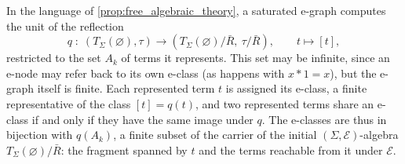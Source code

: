 In the language of \cref{prop:free_algebraic_theory}, a saturated e-graph
computes the unit of the reflection
\[
q \;:\; (T_\Sigma(\varnothing), \tau)
\longrightarrow (T_\Sigma(\varnothing)/\bar R,\ \tau/\bar R),
\qquad t \mapsto [t],
\]
restricted to the set $A_k$ of terms it represents. This set may be
infinite, since an e-node may refer back to its own e-class (as happens
with $x \ast 1 = x$), but the e-graph itself is finite. 
Each
represented term $t$ is assigned its e-class, a finite representative of
the class $[t] = q(t)$, and two represented terms share an e-class if and
only if they have the same image under $q$. The e-classes are thus in
bijection with $q(A_k)$, a finite subset of the carrier of the initial
$(\Sigma, \mathcal{E})$-algebra $T_\Sigma(\varnothing)/\bar R$: the
fragment spanned by $t$ and the terms reachable from it under
$\mathcal{E}$. 

